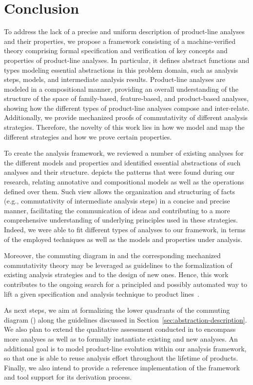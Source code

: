 \section{Conclusion}
\label{sec:conclusion}

To address the lack of a precise and uniform description of product-line analyses and their properties, we propose a framework consisting of a machine-verified theory comprising formal specification and verification of key concepts and properties of product-line analyses. In particular, it defines abstract functions and types modeling essential abstractions in this problem domain, such as analysis steps, models, and intermediate analysis results. Product-line analyses are %
modeled in a compositional manner, providing an overall understanding of the structure of the space of family-based, feature-based, and product-based 
analyses, showing how the different types of product-line analyses compose and inter-relate. Additionally, we provide mechanized proofs of commutativity of different analysis strategies. Therefore, the novelty of this work lies in how we model and map the different strategies and how we prove certain properties. 

To create the %
analysis framework, we reviewed a number of existing analyses for the different models and properties and identified essential abstractions of such analyses and their structure.
 depicts the patterns that were found during our
research, relating annotative and compositional models as well as the
operations defined over them.
Such view allows the organization and structuring of facts (e.g.,
commutativity of intermediate analysis steps) in a concise and precise
manner, facilitating the communication of ideas and contributing to a more
comprehensive understanding of underlying principles used in these
strategies.
Indeed, we were able to fit different types of analyses to our framework, in terms of
the employed techniques as well as the models and properties under analysis.

Moreover, the commuting diagram in  and the
corresponding mechanized commutativity theory may be leveraged as guidelines to the
formalization of existing analysis strategies and to the design of new ones.
Hence, this work contributes to the ongoing search for a
principled and possibly automated way to lift a given specification and
analysis technique to product lines~\cite{Thum2014}.

As next steps, we aim at formalizing the lower quadrants of the commuting diagram () along the guidelines discussed in Section~\ref{sec:abstraction-description}.
We also plan to extend the qualitative assessment conducted in  to encompass more analyses as well as to formally instantiate existing and new analyses.
An additional goal is to model product-line evolution within our
analysis framework, so that one is able to reuse analysis effort throughout the
lifetime of products.
Finally, we also intend to provide a reference implementation of the framework and tool support for its derivation process.